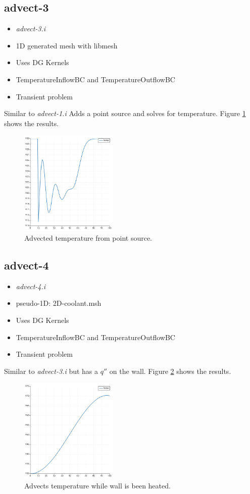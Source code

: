 \documentclass[11pt,letterpaper]{article}
\begin{document}
	\subsection{advect-3}

	\begin{itemize}
		\item \textit{advect-3.i}
		\item 1D generated mesh with libmesh
		\item Uses DG Kernels
		\item TemperatureInflowBC and TemperatureOutflowBC
		\item Transient problem
	\end{itemize}

    Similar to \textit{advect-1.i}
    Adds a point source and solves for temperature.
    Figure \ref{fig:advect-3} shows the results.

	\begin{figure}[htbp!]
		\centering
		\includegraphics[height=5cm]{advect-3}
		\caption{Advected temperature from point source.}
		\label{fig:advect-3}
	\end{figure}

	\subsection{advect-4}

	\begin{itemize}
		\item \textit{advect-4.i}
		\item pseudo-1D: 2D-coolant.msh
		\item Uses DG Kernels
		\item TemperatureInflowBC and TemperatureOutflowBC
		\item Transient problem
	\end{itemize}

    Similar to \textit{advect-3.i} but has a $q''$ on the wall.
    Figure \ref{fig:advect-4} shows the results.

	\begin{figure}[htbp!]
		\centering
		\includegraphics[height=5cm]{advec4}
		\caption{Advects temperature while wall is been heated.}
		\label{fig:advect-4}
	\end{figure}

\pagebreak

% 
\end{document}
